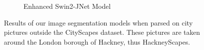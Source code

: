 \begin{figure}[H]
\begin{subfigure}[t]{.32\textwidth}
		\caption{Enhanced Swin2-JNet Model}
	\end{subfigure}
	\caption{Results of our image segmentation models when parsed on city pictures outside the CityScapes dataset. These pictures are taken around the London borough of Hackney, thus HackneyScapes.}
\end{figure}
